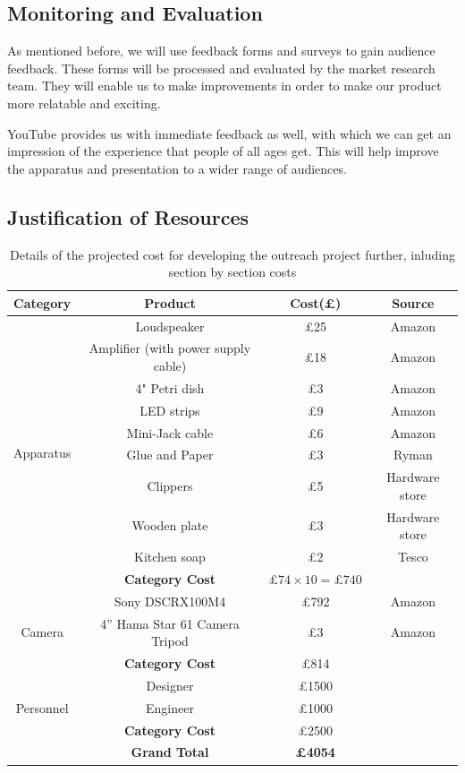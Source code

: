 \subsection{Monitoring and Evaluation}

As mentioned before, we will use feedback forms and surveys to gain audience feedback. These forms will be processed and evaluated by the market research team. They will enable us to make improvements in order to make our product more relatable and exciting. 

YouTube provides us with immediate feedback as well, with which we can get an impression of the experience that people of all ages get. This will help improve the apparatus and presentation to a wider range of audiences. 


\subsection{Justification of Resources}
\bigskip
\begin{table}
\centering
\begin{tabular}{|c|c|c|c|}
\hline
\textbf{Category}& \textbf{Product} & \textbf{Cost(\pounds)} & \textbf{Source} \\
\hline
\multirow{10}{4em}{Apparatus} & Loudspeaker & \pounds25 & Amazon\\
& Amplifier (with power supply cable) & \pounds18 & Amazon \\ 
& 4" Petri dish & \pounds3 & Amazon\\
& LED strips & \pounds9 & Amazon\\
& Mini-Jack cable & \pounds6 & Amazon\\
& Glue and Paper & \pounds3 & Ryman\\
& Clippers & \pounds5 & Hardware store\\
& Wooden plate & \pounds3 & Hardware store\\
& Kitchen soap & \pounds2 & Tesco\\
& \textbf{Category Cost} & $ \pounds74 \times 10= \pounds 740$ &  \\
\hline
\multirow{3}{4em}{Camera} & Sony DSCRX100M4 & \pounds792 & Amazon\\
& 4'' Hama Star 61 Camera Tripod & \pounds3 & Amazon\\
& \textbf{Category Cost} & \pounds814 &  \\
\hline
\multirow{3}{4em}{Personnel} & Designer & \pounds1500 &  \\
& Engineer & \pounds1000 &  \\
& \textbf{Category Cost} & \pounds 2500 &  \\
\hline
\textbf{ }& \textbf{Grand Total} & \textbf{\pounds4054} &   \\
\hline

\end{tabular}
\caption{Details of the projected cost for developing the outreach project further, inluding section by section costs}
\label{table:STFC_costs}
\end{table}
\bigskip

